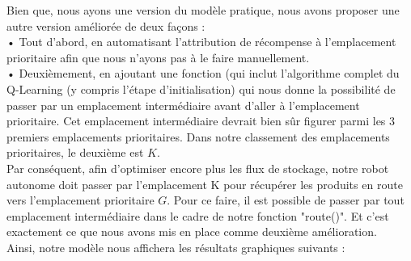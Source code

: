 \documentclass{article}
\begin{document}
Bien que, nous ayons une  version du modèle pratique, nous avons proposer une autre version  améliorée de deux façons :\\
•	Tout d'abord, en automatisant l'attribution de récompense à l'emplacement prioritaire afin que nous n'ayons pas à le faire manuellement. \\
•	Deuxièmement, en ajoutant une fonction (qui inclut l'algorithme complet du Q-Learning (y compris l'étape d'initialisation) qui nous donne la possibilité de passer
par un emplacement intermédiaire avant d'aller à l'emplacement prioritaire. Cet emplacement intermédiaire devrait bien sûr figurer parmi les 3 premiers emplacements prioritaires. Dans notre classement des emplacements prioritaires, le deuxième est $K$. \\
Par conséquent, afin d'optimiser encore plus les flux de stockage, notre robot autonome doit passer par l'emplacement K pour récupérer les produits en route vers l'emplacement
prioritaire $G$. Pour ce faire, il est possible de passer par tout emplacement intermédiaire dans le cadre de notre fonction "route()". Et c'est exactement ce que nous avons mis en place comme deuxième amélioration.\\
Ainsi, notre modèle  nous affichera les résultats graphiques  suivants :
\end{document}

